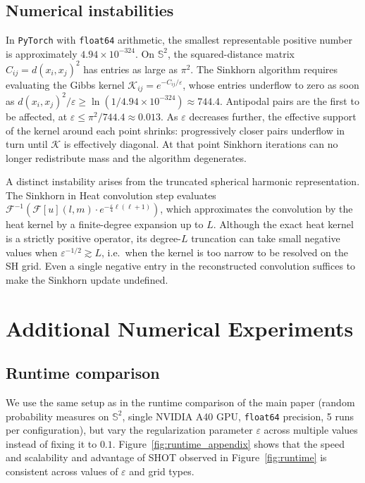 \documentclass{article}
\theoremstyle{plain}
\theoremstyle{definition}
\theoremstyle{remark}
\renewcommand{\S}{\ensuremath{\mathbb{S}}}
\begin{document}
\subsection{Numerical instabilities}\label{appendix:numerical_instabilites}
\label{appendix:instabilities}

In \texttt{PyTorch} with \texttt{float64} arithmetic, the smallest representable positive number is approximately $4.94\times10^{-324}$.
On $\mathbb{S}^2$, the squared-distance matrix $C_{ij}=d(x_i,x_j)^2$ has entries as large as $\pi^2$. 
The Sinkhorn algorithm requires evaluating the Gibbs kernel $\mathcal{K}_{ij}=e^{-C_{ij}/\varepsilon}$, whose entries underflow to zero as soon as $d(x_i,x_j)^2/\varepsilon \geq \ln\!\left(1/4.94\times10^{-324}\right) \approx 744.4$. 
Antipodal pairs are the first to be affected, at $\varepsilon \leq \pi^2/744.4 \approx 0.013$. As $\varepsilon$ decreases further, the effective support of the kernel around each point shrinks: progressively closer pairs underflow in turn until $\mathcal{K}$ is effectively diagonal. 
At that point Sinkhorn iterations can no longer redistribute mass and the algorithm degenerates.

A distinct instability arises from the truncated spherical harmonic representation. 
The Sinkhorn in Heat convolution step evaluates $\mathcal{F}^{-1}(\mathcal{F}[u](l,m) \cdot e^{-\frac{\varepsilon}{4}\ell(\ell+1)})$, which approximates the convolution by the heat kernel by a finite-degree expansion up to $L$. 
Although the exact heat kernel is a strictly positive operator, its degree-$L$ truncation can take small negative values when $\varepsilon^{-1/2} \gtrsim L$, i.e.\ when the kernel is too narrow to be resolved on the SH grid. 
Even a single negative entry in the reconstructed convolution suffices to make the Sinkhorn update undefined.





\section{Additional Numerical Experiments}
\subsection{Runtime comparison}\label{appendix:runtime}

We use the same setup as in the runtime comparison of the main paper (random probability measures on $\S^2$, single NVIDIA A40 GPU, \texttt{float64} precision, 5 runs per configuration), but vary the regularization parameter $\varepsilon$ across multiple values instead of fixing it to $0.1$.
Figure~\ref{fig:runtime_appendix} shows that the speed and scalability and advantage of \textsc{SHOT} observed in Figure~\ref{fig:runtime} is consistent across values of $\varepsilon$ and grid types.
\end{document}
